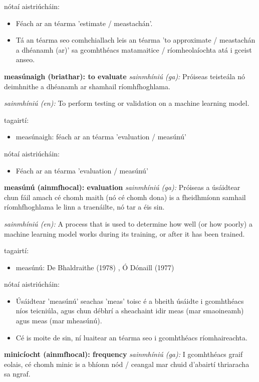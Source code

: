 \documentclass{article}
\begin{document}
nótaí aistriúcháin:
\begin{itemize}
	\item Féach ar an téarma 'estimate / meastachán'.
	\item Tá an téarma seo comhchiallach leis an téarma 'to approximate / meastachán a dhéanamh (ar)' sa gcomhthéacs matamaitice / ríomheolaíochta atá i gceist anseo.
\end{itemize}


\textbf{measúnaigh (briathar): to evaluate}
\textit{sainmhíniú (ga):} Próiseas teisteála nó deimhnithe a dhéanamh ar shamhail ríomhfhoghlama.

\textit{sainmhíniú (en):} To perform testing or validation on a machine learning model.

tagairtí:
\begin{itemize}
	\item measúnaigh: féach ar an téarma 'evaluation / measúnú'
\end{itemize}

nótaí aistriúcháin:
\begin{itemize}
	\item Féach ar an téarma 'evaluation / measúnú'
\end{itemize}


\textbf{measúnú (ainmfhocal): evaluation}
\textit{sainmhíniú (ga):} Próiseas a úsáidtear chun fáil amach cé chomh maith (nó cé chomh dona) is a fheidhmíonn samhail ríomhfhoghlama le linn a traenáilte, nó tar a éis sin.

\textit{sainmhíniú (en):} A process that is used to determine how well (or how poorly) a machine learning model works during its training, or after it has been trained.

tagairtí:
\begin{itemize}
	\item measúnú: De Bhaldraithe (1978) \cite{de-bhaldraithe}, Ó Dónaill (1977) \cite{odonaill}
\end{itemize}

nótaí aistriúcháin:
\begin{itemize}
	\item Úsáidtear 'measúnú' seachas 'meas' toisc é a bheith úsáidte i gcomhthéacs níos teicniúla, agus chun débhrí a sheachaint idir meas (mar smaoineamh) agus meas (mar mheasúnú).
	\item Cé is moite de sin, ní luaitear an téarma seo i gcomhthéacs ríomhaireachta.
\end{itemize}


\textbf{minicíocht (ainmfhocal): frequency}
\textit{sainmhíniú (ga):} I gcomhthéacs graif eolais, cé chomh minic is a bhíonn nód / ceangal mar chuid d'abairtí thriaracha sa ngraf.
\end{document}
